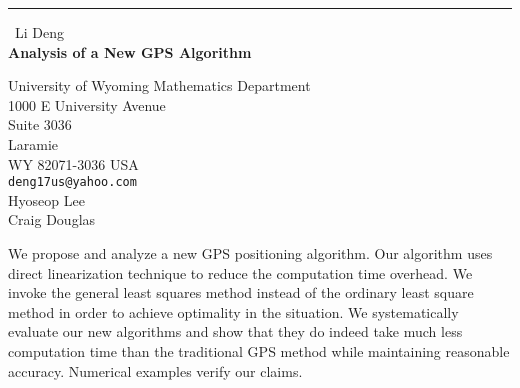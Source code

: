 \documentclass{report}
\begin{document}
\begin{center}
\rule{6in}{1pt} \
{\large Li Deng \\
{\bf Analysis of a New GPS Algorithm}}

University of Wyoming Mathematics Department \\ 1000 E University Avenue \\ Suite 3036 \\ Laramie \\ WY 82071-3036 USA
\\
{\tt deng17us@yahoo.com}\\
Hyoseop Lee\\
Craig Douglas\end{center}

We propose and analyze a new GPS positioning algorithm. Our algorithm
uses direct linearization technique to reduce the computation time
overhead. We invoke the general least squares method instead of the
ordinary least square method in order to achieve optimality in the
situation. We systematically evaluate our new algorithms and show that
they do indeed take much less
computation time than the traditional GPS method while maintaining
reasonable accuracy. Numerical examples verify our claims.
\end{document}
